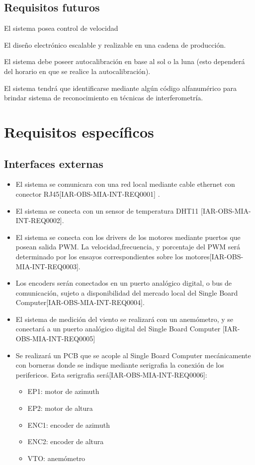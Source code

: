 \documentclass[12pt,a4paper, twosite]{article}
\begin{document}
	
	
	\subsection{Requisitos futuros}
	\label{sec:org33cfcdb}
	El sistema posea control de velocidad 
	
	El diseño electrónico escalable y realizable en una cadena de producción.  
	
	El sistema debe poseer autocalibración en base al sol o la luna (esto dependerá del horario en que se realice la autocalibración).  
	
	El sistema tendrá que identificarse mediante algún código alfanumérico para brindar sistema de reconocimiento en técnicas de interferometría. 
	
	
	\section{Requisitos específicos}
	\label{sec:org40573d1}
	
	
	\subsection{Interfaces externas}
	\label{sec:orgfd5391f}
	\begin{itemize}
		\item El sistema se comunicara con una red local mediante cable ethernet con conector RJ45[IAR-OBS-MIA-INT-REQ0001] .
		\item El sistema se conecta con un sensor de temperatura DHT11 [IAR-OBS-MIA-INT-REQ0002]. 
		\item El sistema se conecta con los drivers de los motores mediante puertos que posean salida PWM. La velocidad,frecuencia, y porcentaje del PWM será determinado por los ensayos correspondientes sobre los motores[IAR-OBS-MIA-INT-REQ0003].  
		\item Los encoders serán conectados en un puerto analógico digital, o bus de comunicación, sujeto a disponibilidad del mercado local del Single Board Computer[IAR-OBS-MIA-INT-REQ0004]. 
		\item El sistema de medición del viento se realizará con un anemómetro, y se conectará a un puerto analógico digital del Single Board Computer [IAR-OBS-MIA-INT-REQ0005]
		\item Se realizará un PCB que se acople al Single Board Computer mecánicamente con borneras donde se indique mediante serigrafia la conexión de los perifericos. Esta serigrafia será[IAR-OBS-MIA-INT-REQ0006]: 
		\begin{itemize}
			\item EP1: motor de azimuth 
			\item EP2: motor de altura
			\item ENC1: encoder de azimuth 
			\item ENC2: encoder de altura 
			\item VTO: anemómetro 
			
		\end{itemize} 
		
	\end{itemize}
	
\end{document}
